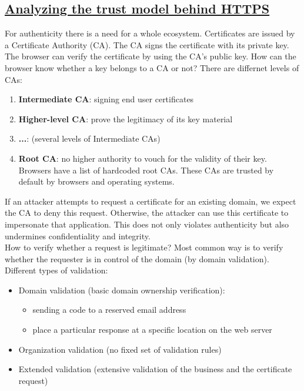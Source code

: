 \documentclass[titlepage]{article}
\begin{document}
    \subsection{\href{https://youtu.be/pc3E_y-BSB0}{Analyzing the trust model behind HTTPS}}
    For authenticity there is a need for a whole ecosystem. Certificates are issued by a Certificate Authority (CA). The CA signs the certificate with its private key. The browser can verify the certificate by using the CA's public key. How can the browser know whether a key belongs to a CA or not? There are differnet levels of CAs:
    \begin{enumerate}
        \item \textbf{Intermediate CA}: signing end user certificates
        \item \textbf{Higher-level CA}: prove the legitimacy of its key material
        \item \textbf{...}: (several levels of Intermediate CAs)
        \item \textbf{Root CA}: no higher authority to vouch for the validity of their key. Browsers have a list of hardcoded root CAs. These CAs are trusted by default by browsers and operating systems.
    \end{enumerate}
    If an attacker attempts to request a certificate for an existing domain, we expect the CA to deny this request. Otherwise, the attacker can use this certificate to impersonate that application. This does not only violates authenticity but also undermines confidentiality and integrity.\\
    How to verify whether a request is legitimate? Most common way is to verify whether the requester is in control of the domain (by domain validation).
    Different types of validation:
    \begin{itemize}
        \item Domain validation (basic domain ownership verification):
        \begin{itemize}
            \item sending a code to a reserved email address
            \item place a particular response at a specific location on the web server
        \end{itemize}
        \item Organization validation (no fixed set of validation rules)
        \item Extended validation (extensive validation of the business and the certificate request)
    \end{itemize}
\end{document}
